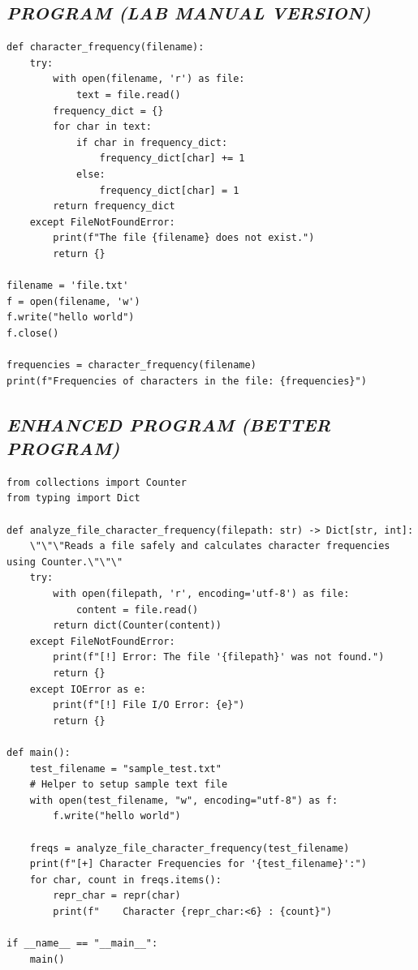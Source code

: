 \documentclass[11pt,a4paper]{article}
\begin{document}
\subsection*{\textit{PROGRAM (LAB MANUAL VERSION)}}
\begin{lstlisting}[style=pythonstyle]
def character_frequency(filename): 
    try: 
        with open(filename, 'r') as file: 
            text = file.read() 
        frequency_dict = {} 
        for char in text: 
            if char in frequency_dict: 
                frequency_dict[char] += 1 
            else: 
                frequency_dict[char] = 1 
        return frequency_dict 
    except FileNotFoundError: 
        print(f"The file {filename} does not exist.") 
        return {} 

filename = 'file.txt' 
f = open(filename, 'w') 
f.write("hello world") 
f.close() 

frequencies = character_frequency(filename) 
print(f"Frequencies of characters in the file: {frequencies}")
\end{lstlisting}

\subsection*{\textit{ENHANCED PROGRAM (BETTER PROGRAM)}}
\begin{lstlisting}[style=pythonstyle]
from collections import Counter
from typing import Dict

def analyze_file_character_frequency(filepath: str) -> Dict[str, int]:
    \"\"\"Reads a file safely and calculates character frequencies using Counter.\"\"\"
    try:
        with open(filepath, 'r', encoding='utf-8') as file:
            content = file.read()
        return dict(Counter(content))
    except FileNotFoundError:
        print(f"[!] Error: The file '{filepath}' was not found.")
        return {}
    except IOError as e:
        print(f"[!] File I/O Error: {e}")
        return {}

def main():
    test_filename = "sample_test.txt"
    # Helper to setup sample text file
    with open(test_filename, "w", encoding="utf-8") as f:
        f.write("hello world")
        
    freqs = analyze_file_character_frequency(test_filename)
    print(f"[+] Character Frequencies for '{test_filename}':")
    for char, count in freqs.items():
        repr_char = repr(char)
        print(f"    Character {repr_char:<6} : {count}")

if __name__ == "__main__":
    main()
\end{lstlisting}
\end{document}
